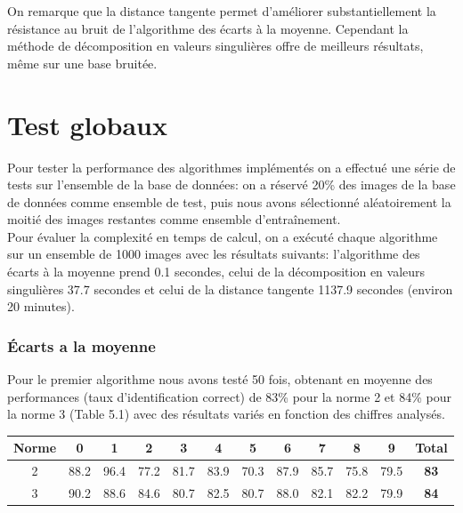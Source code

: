 \documentclass[a4paper,11pt,twoside]{report}
\begin{document}
On remarque que la distance tangente permet d’améliorer substantiellement la résistance au bruit de l'algorithme des écarts à la moyenne. Cependant la méthode de décomposition en valeurs singulières offre de meilleurs résultats, même sur une base bruitée.

\chapter{Test globaux}

Pour tester la performance des algorithmes implémentés on a effectué une série de tests sur l'ensemble de la base de données: on a réservé 20\% des images de la base de données comme ensemble de test, puis nous avons sélectionné aléatoirement la moitié des images restantes comme ensemble d’entraînement.\\
Pour évaluer la complexité en temps de calcul, on a exécuté chaque algorithme sur un ensemble de 1000 images avec les résultats suivants: l'algorithme des écarts à la moyenne prend 0.1 secondes, celui de la décomposition en valeurs singulières 37.7 secondes et celui de la distance tangente 1137.9 secondes (environ 20 minutes).

\subsection{Écarts a la moyenne}
Pour le premier algorithme nous avons testé 50 fois, obtenant en moyenne des performances (taux d'identification correct) de 83\% pour la norme 2 et 84\% pour la norme 3 (Table 5.1) avec des résultats variés en fonction des chiffres analysés.

\begin{center}
\begin{tabular}{ |c||c|c|c|c|c|c|c|c|c|c|c| } 
\hline
 Norme & 0 & 1 & 2 & 3 & 4 & 5 & 6 & 7 & 8 & 9 & \textbf{Total} \\ 
  \hline
  \hline
  2 & 88.2 & 96.4 & 77.2 & 81.7 & 83.9 & 70.3 & 87.9 & 85.7 & 75.8 & 79.5 & \textbf{83} \\
 \hline
  3 & 90.2 & 88.6 & 84.6 & 80.7 & 82.5 & 80.7 & 88.0 & 82.1 & 82.2 & 79.9 & \textbf{84} \\
 \hline
\end{tabular}
\end{center}
\end{document}
